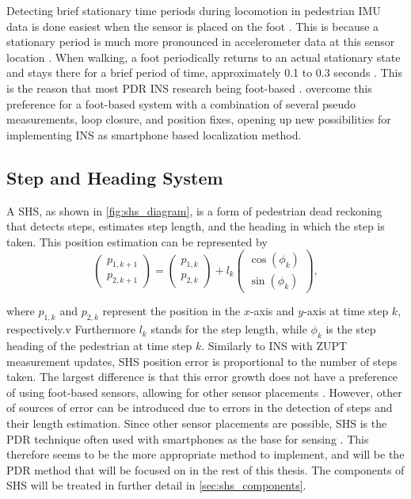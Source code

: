 Detecting brief stationary time periods during locomotion in pedestrian \ac{IMU} data is done easiest when the sensor is placed on the foot \cite{Diez2018,Davidson2017}. This is because a stationary period is much more pronounced in accelerometer data at this sensor location \cite{Yu2019,Wu2019}.  When walking, a foot periodically returns to an actual stationary state and stays there for a brief period of time, approximately 0.1 to 0.3 seconds \cite{Ren2016a}. This is the reason that most \ac{PDR} \ac{INS} research being foot-based \cite{Diez2018,Wu2019}. \citet{Solin2018a} overcome this preference for a foot-based system with a combination of several pseudo measurements, loop closure, and position fixes, opening up new possibilities for implementing INS as smartphone based localization method.

\subsection{Step and Heading System }

A \acf{SHS}, as shown in \cref{fig:shs_diagram}, is a form of pedestrian dead reckoning that detects steps, estimates step length, and the heading in which the step is taken. This position estimation can be represented by \cite{MunozDiaz2019}
\begin{equation}
	\label{eq:SHS_dynamic_model}
	\left(\begin{array}{l}
		p_{1,k+1} \\
		p_{2,k+1}
	\end{array}\right) 
	=
	\left(\begin{array}{l}
		p_{1,k} \\
		p_{2,k}
	\end{array}\right) 
	+l_{k} \left(\begin{array}{l}
		\cos \left(\phi_{k}\right) \\
		\sin \left(\phi_{k}\right)
	\end{array}\right),
\end{equation}

where $p_{1,k}$  and  $p_{2,k}$ represent the position in the $x$-axis and $y$-axis at time step  $k$, respectively.v Furthermore $l_{k}$ stands for the step length, while $\phi_{k}$ is the step heading of the pedestrian at time step $k$.
Similarly to INS with ZUPT measurement updates, \ac{SHS} position error is proportional to the number of steps taken. The largest difference is that this error growth does not have a preference of using foot-based sensors, allowing for other sensor placements \cite{Diez2018b}. However, other of sources of error can be introduced due to errors in the detection of steps and their length estimation.  Since other sensor placements are possible, \ac{SHS} is the PDR technique often used with smartphones as the base for sensing \cite{Kang2015}. This therefore seems to be the more appropriate method to implement, and will be the \ac{PDR} method that will be focused on in the rest of this thesis. The components of \ac{SHS} will be treated in further detail in \cref{sec:shs_components}.

